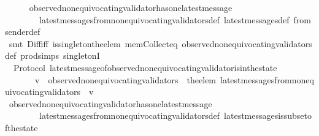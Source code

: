 \begin{isabellebody}
%
\isadelimproof
\ \ \ \ %
\endisadelimproof
%
\isatagproof
{}\isamarkupfalse%
\ observed{\isacharunderscore}non{\isacharunderscore}equivocating{\isacharunderscore}validator{\isacharunderscore}has{\isacharunderscore}one{\isacharunderscore}latest{\isacharunderscore}message\ \isanewline
\ \ \ \ \ \ \ \ latest{\isacharunderscore}messages{\isacharunderscore}from{\isacharunderscore}non{\isacharunderscore}equivocating{\isacharunderscore}validators{\isacharunderscore}def\ latest{\isacharunderscore}messages{\isacharunderscore}def\ from{\isacharunderscore}sender{\isacharunderscore}def\isanewline
\ \ \ \ \isamarkupfalse%
\ {\isacharparenleft}smt\ Diff{\isacharunderscore}iff\ is{\isacharunderscore}singleton{\isacharunderscore}the{\isacharunderscore}elem\ mem{\isacharunderscore}Collect{\isacharunderscore}eq\ observed{\isacharunderscore}non{\isacharunderscore}equivocating{\isacharunderscore}validators{\isacharunderscore}def\ prod{\isachardot}simps{\isacharparenleft}{}{\isacharparenright}\ singletonI{\isacharparenright}%
\endisatagproof
{\isafoldproof}%
%
\isadelimproof
\isanewline
%
\endisadelimproof
\isanewline
{}\isamarkupfalse%
\ {\isacharparenleft}\ Protocol{\isacharparenright}\ latest{\isacharunderscore}message{\isacharunderscore}of{\isacharunderscore}observed{\isacharunderscore}non{\isacharunderscore}equivocating{\isacharunderscore}validator{\isacharunderscore}is{\isacharunderscore}in{\isacharunderscore}the{\isacharunderscore}state{\isacharcolon}\ \isanewline
\ \ {\isachardoublequoteopen}{\isasymforall}\ {\isasymsigma}\ {\isasymin}\ {\isasymSigma}{\isachardot}\ {\isasymforall}\ v\ {\isasymin}\ observed{\isacharunderscore}non{\isacharunderscore}equivocating{\isacharunderscore}validators\ {\isasymsigma}{\isachardot}\ the{\isacharunderscore}elem\ {\isacharparenleft}latest{\isacharunderscore}messages{\isacharunderscore}from{\isacharunderscore}non{\isacharunderscore}equivocating{\isacharunderscore}validators\ {\isasymsigma}\ v{\isacharparenright}\ {\isasymin}\ {\isasymsigma}{\isachardoublequoteclose}\ \isanewline
%
\isadelimproof
\ \ \ \ %
\endisadelimproof
%
\isatagproof
{}\isamarkupfalse%
\ observed{\isacharunderscore}non{\isacharunderscore}equivocating{\isacharunderscore}validator{\isacharunderscore}has{\isacharunderscore}one{\isacharunderscore}latest{\isacharunderscore}message\ \isanewline
\ \ \ \ \ \ \ \ latest{\isacharunderscore}messages{\isacharunderscore}from{\isacharunderscore}non{\isacharunderscore}equivocating{\isacharunderscore}validators{\isacharunderscore}def\ latest{\isacharunderscore}messages{\isacharunderscore}is{\isacharunderscore}subset{\isacharunderscore}of{\isacharunderscore}the{\isacharunderscore}state\isanewline

\end{isabellebody}
